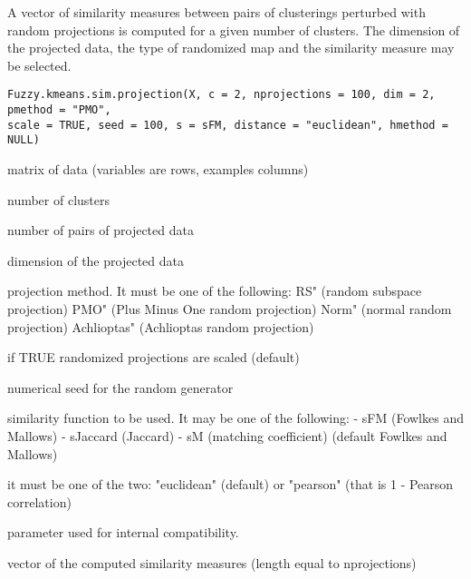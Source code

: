 \documentclass{article}
\begin{document}
\begin{Description}\relax
A vector of similarity measures between pairs of clusterings perturbed with random projections is computed for a given number of clusters. 
The dimension of the projected data, the type of randomized map and the similarity measure may be selected.
\end{Description}
\begin{Usage}
\begin{verbatim}
Fuzzy.kmeans.sim.projection(X, c = 2, nprojections = 100, dim = 2, pmethod = "PMO", 
scale = TRUE, seed = 100, s = sFM, distance = "euclidean", hmethod = NULL)
\end{verbatim}
\end{Usage}
\begin{Arguments}
\begin{ldescription}
\item[\code{X}] matrix of data (variables are rows, examples columns) 
\item[\code{c}] number of clusters 
\item[\code{nprojections}] number of pairs of projected data 
\item[\code{dim}] dimension of the projected data 
\item[\code{pmethod}] projection method. It must be one of the following:  
RS" (random subspace projection)
PMO" (Plus Minus One random projection)
Norm" (normal random projection)
Achlioptas" (Achlioptas random projection)
\item[\code{scale}] if TRUE randomized projections are scaled (default) 
\item[\code{seed}] numerical seed for the random generator 
\item[\code{s}] similarity function to be used. It may be one of the following: 
- sFM (Fowlkes and Mallows)
- sJaccard (Jaccard)
- sM (matching coefficient)
(default Fowlkes and Mallows) 
\item[\code{distance}] it must be one of the two: "euclidean" (default) or "pearson" (that is 1 - Pearson correlation)
\item[\code{hmethod}] parameter used for internal compatibility. 
\end{ldescription}
\end{Arguments}
\begin{Value}
vector of the computed similarity measures (length equal to nprojections)
\end{Value}
\end{document}
